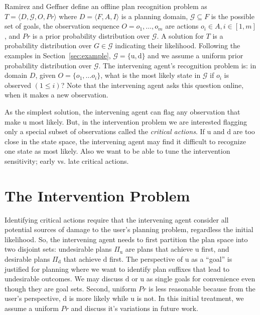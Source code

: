 \documentclass[letterpaper]{article}
\theoremstyle{plain}
\begin{document}
Ramirez and Geffner  define an offline plan recognition problem as $T= \langle D, \mathcal{G}, O, Pr \rangle$ where $D=\langle F, A, I \rangle$ is a planning domain, $\mathcal{G} \subseteq F$ is the possible set of goals, the observation sequence $O = o_1, \ldots , o_m$ are actions $o_i \in A, i \in[1,m]$, and $Pr$ is a prior probability distribution over $\mathcal{G}$. A solution for $T$ is a probability distribution over $G \in \mathcal{G}$ indicating their likelihood. 
Following the examples in Section~\ref{sec:example}, $\mathcal{G}=\lbrace\mathrm{u}, \mathrm{d}\rbrace$ and we assume a uniform prior probability distribution over $\mathcal{G}$. 
The intervening agent's recognition problem is: in domain $D$, given $O = \lbrace o_1, \ldots o_i\rbrace$, what is the most likely state in $\mathcal{G}$ if $o_i$ is observed $(1\leq i)$? 
Note that the intervening agent asks this question online, when it makes a new observation.

As the simplest solution, the intervening agent can flag any observation that make $\mathrm{u}$ most likely. 
But, in the intervention problem we are interested flagging only a special subset of observations called the \textit{critical actions}. If $\mathrm{u}$ and $\mathrm{d}$ are too close in the state space, the intervening agent may find it difficult to recognize one state as most likely. Also we want to be able to tune the intervention sensitivity; early vs. late critical actions.


\section{The Intervention Problem}
\label{sec:ip}
Identifying critical actions require that the intervening agent consider all potential sources of damage to the user's planning problem, regardless the initial likelihood. 
So, the intervening agent needs to first partition the plan space into two disjoint sets: undesirable plans $\Pi_{\mathrm{u}}$ are plans that achieve $\mathrm{u}$ first, and desirable plans $\Pi_{\mathrm{d}}$ that achieve $\mathrm{d}$ first. The perspective of $\mathrm{u}$ as a ``goal'' is justified for planning where we want to identify plan suffixes that lead to undesirable outcomes. 
We may discuss $\mathrm{d}$ or $\mathrm{u}$ as single goals for convenience even though they are goal sets.
Second, uniform $Pr$ is less reasonable because from the user's perspective, $\mathrm{d}$ is more likely while $\mathrm{u}$ is not. 
In this initial treatment, we assume a uniform $Pr$ and discuss it's variations in future work.
\end{document}
